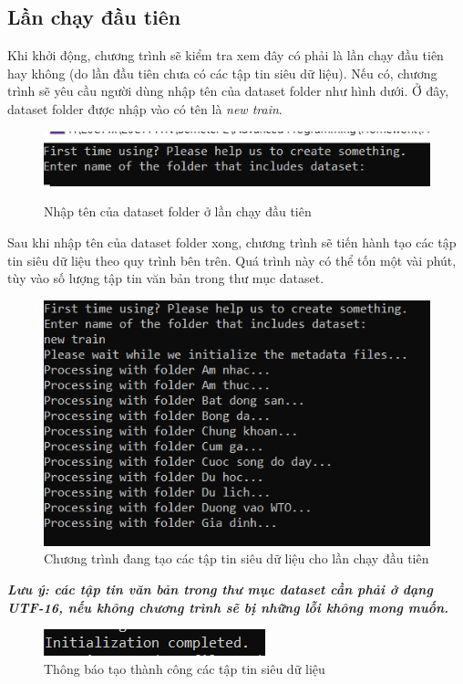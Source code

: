 \documentclass[12pt,a4paper]{article}
\begin{document}
\subsection{Lần chạy đầu tiên}
Khi khởi động, chương trình sẽ kiểm tra xem đây có phải là lần chạy đầu tiên hay không (do lần đầu tiên chưa có các tập tin siêu dữ liệu). Nếu có, chương trình sẽ yêu cầu người dùng nhập tên của dataset folder như hình dưới. Ở đây, dataset folder được nhập vào có tên là \textit{new train}.
\begin{figure}[H]
\begin{center}
\includegraphics[scale=1]{Fig14}
\label{Fig14}
\end{center}
\caption{Nhập tên của dataset folder ở lần chạy đầu tiên}
\end{figure}
Sau khi nhập tên của dataset folder xong, chương trình sẽ tiến hành tạo các tập tin siêu dữ liệu theo quy trình bên trên. Quá trình này có thể tốn một vài phút, tùy vào số lượng tập tin văn bản trong thư mục dataset.
\begin{figure}[H]
\begin{center}
\includegraphics[scale=1]{Fig15}
\end{center}
\caption{Chương trình đang tạo các tập tin siêu dữ liệu cho lần chạy đầu tiên}
\label{Fig15}
\end{figure}
\textbf{\textit{Lưu ý: các tập tin văn bản trong thư mục dataset cần phải ở dạng UTF-16, nếu không chương trình sẽ bị những lỗi không mong muốn.}}
\begin{figure}[H]
\begin{center}
\includegraphics[scale=2]{Fig16}
\end{center}
\caption{Thông báo tạo thành công các tập tin siêu dữ liệu}
\label{Fig16}
\end{figure}
\end{document}
